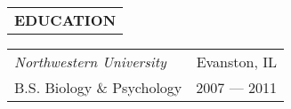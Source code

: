 \begin{tabularx}{\textwidth}{L}
    \textbf{EDUCATION}
\end{tabularx}

\begin{small}

\begin{tabularx}{\textwidth}{L R}
    \normalsize\textit{Northwestern University} & Evanston, IL \\
    \hspace{10pt}B.S. Biology \& Psychology & 2007 --- 2011 \\
\end{tabularx}

\end{small}
